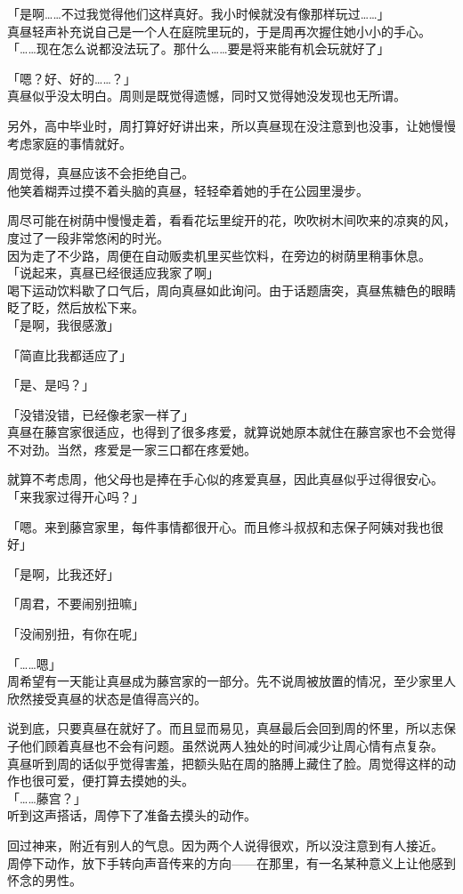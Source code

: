 「是啊……不过我觉得他们这样真好。我小时候就没有像那样玩过……」\\

真昼轻声补充说自己是一个人在庭院里玩的，于是周再次握住她小小的手心。\\

「……现在怎么说都没法玩了。那什么……要是将来能有机会玩就好了」

「嗯？好、好的……？」\\

真昼似乎没太明白。周则是既觉得遗憾，同时又觉得她没发现也无所谓。

另外，高中毕业时，周打算好好讲出来，所以真昼现在没注意到也没事，让她慢慢考虑家庭的事情就好。

周觉得，真昼应该不会拒绝自己。\\

他笑着糊弄过摸不着头脑的真昼，轻轻牵着她的手在公园里漫步。

周尽可能在树荫中慢慢走着，看看花坛里绽开的花，吹吹树木间吹来的凉爽的风，度过了一段非常悠闲的时光。\\

因为走了不少路，周便在自动贩卖机里买些饮料，在旁边的树荫里稍事休息。\\

「说起来，真昼已经很适应我家了啊」\\

喝下运动饮料歇了口气后，周向真昼如此询问。由于话题唐突，真昼焦糖色的眼睛眨了眨，然后放松下来。\\

「是啊，我很感激」

「简直比我都适应了」

「是、是吗？」

「没错没错，已经像老家一样了」\\

真昼在藤宫家很适应，也得到了很多疼爱，就算说她原本就住在藤宫家也不会觉得不对劲。当然，疼爱是一家三口都在疼爱她。

就算不考虑周，他父母也是捧在手心似的疼爱真昼，因此真昼似乎过得很安心。\\

「来我家过得开心吗？」

「嗯。来到藤宫家里，每件事情都很开心。而且修斗叔叔和志保子阿姨对我也很好」

「是啊，比我还好」

「周君，不要闹别扭嘛」

「没闹别扭，有你在呢」

「……嗯」\\

周希望有一天能让真昼成为藤宫家的一部分。先不说周被放置的情况，至少家里人欣然接受真昼的状态是值得高兴的。

说到底，只要真昼在就好了。而且显而易见，真昼最后会回到周的怀里，所以志保子他们顾着真昼也不会有问题。虽然说两人独处的时间减少让周心情有点复杂。\\

真昼听到周的话似乎觉得害羞，把额头贴在周的胳膊上藏住了脸。周觉得这样的动作也很可爱，便打算去摸她的头。\\

「……藤宫？」\\

听到这声搭话，周停下了准备去摸头的动作。

回过神来，附近有别人的气息。因为两个人说得很欢，所以没注意到有人接近。\\

周停下动作，放下手转向声音传来的方向——在那里，有一名某种意义上让他感到怀念的男性。
